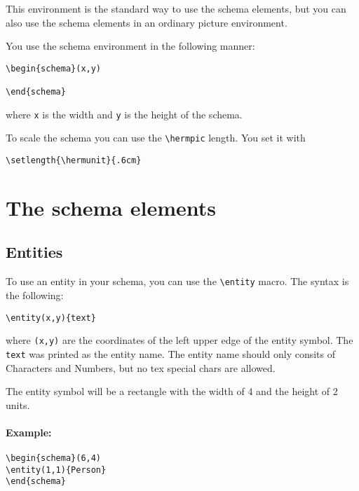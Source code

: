 \documentclass[a4paper,11pt]{article}
\begin{document}
This environment is the standard way to use the schema elements, but you 
can also use the schema elements in an ordinary picture environment.

You use the schema environment in the following manner:

\begin{verbatim}
\begin{schema}(x,y)

\end{schema}
\end{verbatim}

where {\tt x} is the width and {\tt y} is the height of 
the schema.

To scale the schema you can use the \verb|\hermpic| length.
You set it with

\begin{verbatim}
\setlength{\hermunit}{.6cm}
\end{verbatim}

\section{The schema elements}

\subsection{Entities}

To use an entity in your schema, you can use the \verb|\entity| macro.
The syntax is the following:

\begin{verbatim}
\entity(x,y){text}
\end{verbatim}

where {\tt (x,y)} are the coordinates of the left upper edge of the entity
symbol. The {\tt text} was printed as the entity name. The entity name should
only consits of Characters and Numbers, but no tex special chars are allowed.

The entity symbol will be a rectangle with the width of 4 and the height of 2 
units.

\paragraph{Example:}
\begin{verbatim}
\begin{schema}(6,4)
\entity(1,1){Person}
\end{schema}
\end{verbatim}
\end{document}
